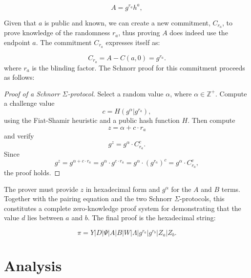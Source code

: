 \documentclass[version=preprint]{iacrcc}
\begin{document}
\begin{equation}
A = g^{r_{a}} h^{a},
\end{equation}

Given that \( a \) is public and known, we can create a new commitment, \( C_{r_a} \), to prove knowledge of the randomness \( r_a \), thus proving $A$ does indeed use the endpoint \(a\). The commitment \( C_{r_a} \) expresses itself as:

\begin{equation}
C_{r_a} = A - C(a, 0) = g^{r_{a}}.
\end{equation}
where \( r_{a} \) is the blinding factor. The Schnorr proof for this commitment proceeds as follows:

\begin{proof}[Proof of a Schnorr $\Sigma$-protocol]
Select a random value \( \alpha \), where \( \alpha \in \mathbb{Z}^+ \). Compute a challenge value
\begin{equation}
c = H(g^{\alpha} | g^{r_{a}}), 
\end{equation}
using the Fiat-Shamir heuristic and a public hash function \( H \). Then compute 
\begin{equation}
z = \alpha + c \cdot r_{a}
\end{equation}
and verify
\begin{equation}
g^{z} = g^{\alpha} \cdot C_{r_a}^{c}.
\end{equation}
Since 
\begin{equation}
g^{z} = g^{\alpha + c \cdot r_{a}} = g^{\alpha} \cdot g^{c \cdot r_{a}} = g^{\alpha} \cdot (g^{r_{a}})^{c} = g^{\alpha} \cdot C_{r_a}^{c},
\end{equation}
the proof holds.
\end{proof}

The prover must provide \( z \) in hexadecimal form and \( g^{\alpha} \) for the \( A \) and \( B \) terms. Together with the pairing equation and the two Schnorr $\Sigma$-protocols, this constitutes a complete zero-knowledge proof system for demonstrating that the value \( d \) lies between \( a \) and \( b \). The final proof is the hexadecimal string:

\begin{equation}
\pi = Y | D | \Psi | A | B | W | \Lambda | g^{r_{a}} | g^{r_{b}} | Z_{a} | Z_{b}.
\end{equation}

\section{Analysis}
\end{document}

